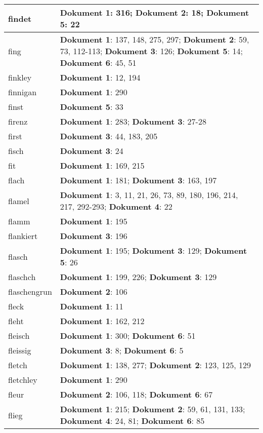 \documentclass[a5paper]{article}
\begin{document}
\begin{longtable}[l]{|l|p{3in}|}
\hline
findet & \textbf{Dokument 1}: 316; \textbf{Dokument 2}: 18; \textbf{Dokument 5}: 22 \\
\hline
fing & \textbf{Dokument 1}: 137, 148, 275, 297; \textbf{Dokument 2}: 59, 73, 112-113; \textbf{Dokument 3}: 126; \textbf{Dokument 5}: 14; \textbf{Dokument 6}: 45, 51 \\
\hline
finkley & \textbf{Dokument 1}: 12, 194 \\
\hline
finnigan & \textbf{Dokument 1}: 290 \\
\hline
finst & \textbf{Dokument 5}: 33 \\
\hline
firenz & \textbf{Dokument 1}: 283; \textbf{Dokument 3}: 27-28 \\
\hline
first & \textbf{Dokument 3}: 44, 183, 205 \\
\hline
fisch & \textbf{Dokument 3}: 24 \\
\hline
fit & \textbf{Dokument 1}: 169, 215 \\
\hline
flach & \textbf{Dokument 1}: 181; \textbf{Dokument 3}: 163, 197 \\
\hline
flamel & \textbf{Dokument 1}: 3, 11, 21, 26, 73, 89, 180, 196, 214, 217, 292-293; \textbf{Dokument 4}: 22 \\
\hline
flamm & \textbf{Dokument 1}: 195 \\
\hline
flankiert & \textbf{Dokument 3}: 196 \\
\hline
flasch & \textbf{Dokument 1}: 195; \textbf{Dokument 3}: 129; \textbf{Dokument 5}: 26 \\
\hline
flaschch & \textbf{Dokument 1}: 199, 226; \textbf{Dokument 3}: 129 \\
\hline
flaschengrun & \textbf{Dokument 2}: 106 \\
\hline
fleck & \textbf{Dokument 1}: 11 \\
\hline
fleht & \textbf{Dokument 1}: 162, 212 \\
\hline
fleisch & \textbf{Dokument 1}: 300; \textbf{Dokument 6}: 51 \\
\hline
fleissig & \textbf{Dokument 3}: 8; \textbf{Dokument 6}: 5 \\
\hline
fletch & \textbf{Dokument 1}: 138, 277; \textbf{Dokument 2}: 123, 125, 129 \\
\hline
fletchley & \textbf{Dokument 1}: 290 \\
\hline
fleur & \textbf{Dokument 2}: 106, 118; \textbf{Dokument 6}: 67 \\
\hline
flieg & \textbf{Dokument 1}: 215; \textbf{Dokument 2}: 59, 61, 131, 133; \textbf{Dokument 4}: 24, 81; \textbf{Dokument 6}: 85 \\

\end{longtable}
\end{document}
